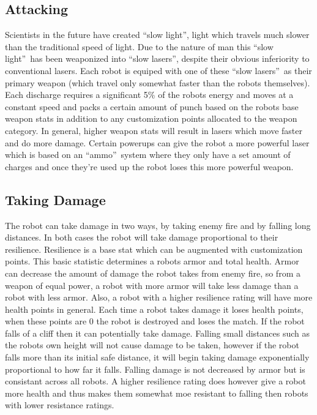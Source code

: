 \documentclass[a4paper]{article}
\newcommand{\og}{``}
\newcommand{\fg}{''}
\begin{document}
\subsection{Attacking}

Scientists in the future have created \og slow light\fg, light which travels much slower than the traditional speed of light. Due to the nature of man this \og slow light\fg\ has been weaponized into \og slow lasers\fg, despite their obvious inferiority to conventional lasers. Each robot is equiped with one of these \og slow lasers\fg\ as their primary weapon (which travel only somewhat faster than the robots themselves). Each discharge requires a significant 5\% of the robots energy and moves at a constant speed and packs a certain amount of punch based on the robots base weapon stats in addition to any customization points allocated to the weapon category. In general, higher weapon stats will result in lasers which move faster and do more damage. Certain powerups can give the robot a more powerful laser which is based on an \og ammo\fg\ system where they only have a set amount of charges and once they're used up the robot loses this more powerful weapon.


\subsection{Taking Damage}

The robot can take damage in two ways, by taking enemy fire and by falling long distances. In both cases the robot will take damage proportional to their resilience. Resilience is a base stat which can be augmented with customization points. This basic statistic determines a robots armor and total health. Armor can decrease the amount of damage the robot takes from enemy fire, so from a weapon of equal power, a robot with more armor will take less damage than a robot with less armor. Also, a robot with a higher resilience rating will have more health points in general. Each time a robot takes damage it loses health points, when these points are 0 the robot is destroyed and loses the match. If the robot falls of a cliff then it can potentially take damage. Falling small distances such as the robots own height will not cause damage to be taken, however if the robot falls more than its initial safe distance, it will begin taking damage exponentially proportional to how far it falls. Falling damage is not decreased by armor but is consistant across all robots. A higher resilience rating does however give a robot more health and thus makes them somewhat moe resistant to falling then robots with lower resistance ratings.
\end{document}
